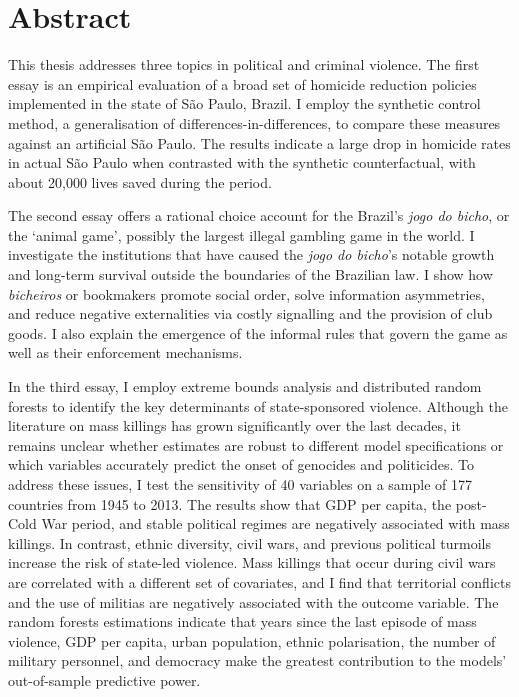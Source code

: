 \documentclass[a4paper,12pt]{report}
\newcommand{\linespacing}{2}
\renewcommand{\baselinestretch}{\linespacing}
\begin{document}
\chapter*{Abstract}
\renewcommand{\baselinestretch}{\linespacing}
\small\normalsize

This thesis addresses three topics in political and criminal violence. The first essay is an empirical evaluation of a broad set of homicide reduction policies implemented in the state of São Paulo, Brazil. I employ the synthetic control method, a generalisation of differences-in-differences, to compare these measures against an artificial São Paulo. The results indicate a large drop in homicide rates in actual São Paulo when contrasted with the synthetic counterfactual, with about 20,000 lives saved during the period. 

The second essay offers a rational choice account for the Brazil's \textit{jogo do bicho}, or the `animal game', possibly the largest illegal gambling game in the world. I investigate the institutions that have caused the \textit{jogo do bicho}'s notable growth and long-term survival outside the boundaries of the Brazilian law. I show how \textit{bicheiros} or bookmakers promote social order, solve information asymmetries, and reduce negative externalities via costly signalling and the provision of club goods. I also explain the emergence of the informal rules that govern the game as well as their enforcement mechanisms. 

In the third essay, I employ extreme bounds analysis and distributed random forests to identify the key determinants of state-sponsored violence. Although the literature on mass killings has grown significantly over the last decades, it remains unclear whether estimates are robust to different model specifications or which variables accurately predict the onset of genocides and politicides. To address these issues, I test the sensitivity of 40 variables on a sample of 177 countries from 1945 to 2013. The results show that GDP per capita, the post-Cold War period, and stable political regimes are negatively associated with mass killings. In contrast, ethnic diversity, civil wars, and previous political turmoils increase the risk of state-led violence. Mass killings that occur during civil wars are correlated with a different set of covariates, and I find that territorial conflicts and the use of militias are negatively associated with the outcome variable. The random forests estimations indicate that years since the last episode of mass violence, GDP per capita, urban population, ethnic polarisation, the number of military personnel, and democracy make the greatest contribution to the models' out-of-sample predictive power.
\end{document}
